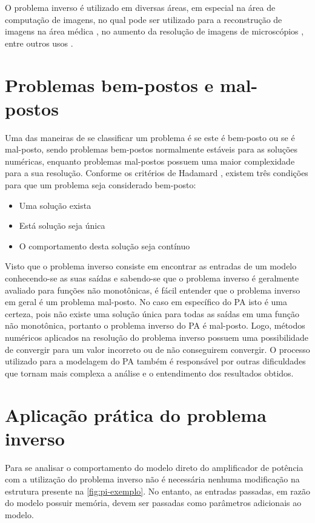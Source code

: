 O problema inverso é utilizado em diversas áreas, em especial na área de computação de imagens, no qual pode ser utilizado para a reconstrução de imagens na área médica \cite{mccann2016fast}, no aumento da resolução de imagens de microscópios \cite{kellman2019data}, entre outros usos \cite{9084378}.

\section{Problemas bem-postos e mal-postos} \label{sec:pi-posto}
Uma das maneiras de se classificar um problema é se este é bem-posto ou se é mal-posto, sendo problemas bem-postos normalmente estáveis para as soluções numéricas, enquanto problemas mal-postos possuem uma maior complexidade para a sua resolução. Conforme os critérios de Hadamard \cite{hadamard1902problemes}, existem três condições para que um problema seja considerado bem-posto:
\begin{itemize}
  \item Uma solução exista
  \item Está solução seja única
  \item O comportamento desta solução seja contínuo
\end{itemize}

Visto que o problema inverso consiste em encontrar as entradas de um modelo conhecendo-se as suas saídas e sabendo-se que o problema inverso é geralmente avaliado para funções não monotônicas, é fácil entender que o problema inverso em geral é um problema mal-posto.
No caso em específico do PA isto é uma certeza, pois não existe uma solução única para todas as saídas em uma função não monotônica, portanto o problema inverso do PA é mal-posto. Logo, métodos numéricos aplicados na resolução do problema inverso possuem uma possibilidade de convergir para um valor incorreto ou de não conseguirem convergir. O processo utilizado para a modelagem do PA também é responsável por outras dificuldades que tornam mais complexa a análise e o entendimento dos resultados obtidos.

\section{Aplicação prática do problema inverso} \label{sec:pi-app}
Para se analisar o comportamento do modelo direto do amplificador de potência com a utilização do problema inverso não é necessária nenhuma modificação na estrutura presente na \autoref{fig:pi-exemplo}. No entanto, as entradas passadas, em razão do modelo possuir memória, devem ser passadas como parâmetros adicionais ao modelo.